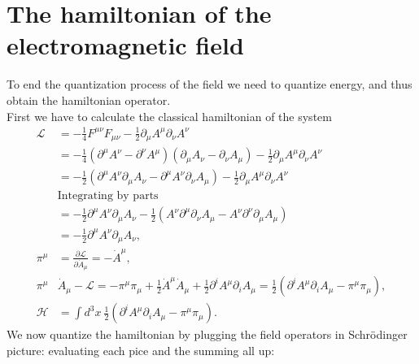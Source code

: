 \section{The hamiltonian of the electromagnetic field}
To end the quantization process of the field we need to quantize energy, and thus obtain the hamiltonian operator.\\ First we have to calculate the classical hamiltonian of the system
\begin{align*}
    \mathcal{L}&=-\frac{1}{4}F^{\mu\nu}F_{\mu\nu}-\frac{1}{2}\partial_\mu A^\mu\partial_\nu A^\nu\\
    &=-\frac{1}{4}(\partial^\mu A^\nu-\partial^\nu A^\mu)(\partial_\mu A_\nu-\partial_\nu A_\mu)-\frac{1}{2}\partial_\mu A^\mu\partial_\nu A^\nu\\
    &=-\frac{1}{2}(\partial^\mu A^\nu\partial_\mu A_\nu-\partial^\mu A^\nu\partial_\nu A_\mu)-\frac{1}{2}\partial_\mu A^\mu\partial_\nu A^\nu\\&\text{Integrating by parts}\\&
    =-\frac{1}{2}\partial^\mu A^\nu\partial_\mu A_\nu-\frac{1}{2}(A^\nu\partial^\mu\partial_\nu A_\mu-A^\nu\partial^\nu\partial_\mu A_\mu)\\&=-\frac{1}{2}\partial^\mu A^\nu\partial_\mu A_\nu,\\
    \pi^\mu&=\frac{\partial\mathcal{L} }{\partial\dot{A}_\mu}=-\dot{A}^\mu,\\
    \pi^\mu&\dot{A}_\mu-\mathcal{L}=-\pi^\mu\pi_\mu+\frac{1}{2}\dot{A}^\mu\dot{A}_\mu+\frac{1}{2}\partial^i A^\mu\partial_i A_\mu=\frac{1}{2}(\partial^i A^\mu\partial_i A_\mu-\pi^\mu\pi_\mu),\\
    \mathcal{H} &=\int d^3x\ \frac{1}{2}(\partial^i A^\mu\partial_i A_\mu-\pi^\mu\pi_\mu).
\end{align*}
We now quantize the hamiltonian by plugging the field operators in Schrödinger picture: evaluating each pice and the summing all up:
